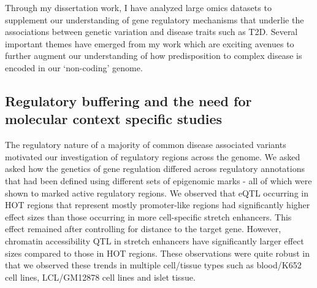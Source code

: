﻿Through my dissertation work, I have analyzed large omics datasets to supplement our understanding of gene regulatory mechanisms that underlie the associations between genetic variation and disease traits such as T2D. Several important themes have emerged from my work which are exciting avenues to further augment our understanding of how predisposition to complex disease is encoded in our ‘non-coding’ genome. 


\subsection{Regulatory buffering and the need for molecular context specific studies}
The regulatory nature of a majority of common disease associated variants motivated our investigation of regulatory regions across the genome. We asked asked how the genetics of gene regulation differed across regulatory annotations that had been defined using different sets of epigenomic marks - all of which were shown to marked active regulatory regions. We observed that eQTL occurring in HOT regions that represent mostly promoter-like regions had significantly higher effect sizes than those occurring in more cell-specific stretch enhancers. This effect remained after controlling for distance to the target gene. However, chromatin accessibility QTL in stretch enhancers have significantly larger effect sizes compared to those in HOT regions. These observations were quite robust in that we observed these trends in multiple cell/tissue types such as blood/K652 cell lines, LCL/GM12878 cell lines and islet tissue.


